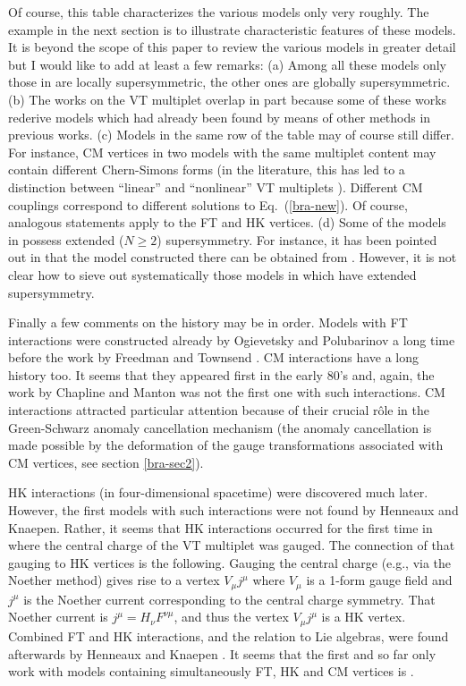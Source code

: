 \documentclass[a4paper,12pt]{article}
\begin{document}
Of course, this table characterizes the various models
only very roughly. 
The example in the next section is to illustrate characteristic
features of these models. It is beyond the scope of this
paper to review the various models in 
greater detail but I would like to add
at least a few remarks: (a) Among all these models
only those in \cite{bra-7} are locally supersymmetric, the
other ones are globally supersymmetric.
(b) The works on the VT multiplet
overlap in part because some of these
works rederive models which had already been found
by means of other methods in previous works.
(c) Models in the same row of the table may of course still differ. 
For instance,
CM vertices in two models with the same multiplet content 
may contain different Chern-Simons forms
(in the literature,
this has led to a distinction between
``linear'' and ``nonlinear'' VT multiplets \cite{bra-2}).
Different CM couplings
correspond to different solutions
to Eq.\ (\ref{bra-new}). Of course, analogous statements apply to the
FT and HK vertices.
(d) Some of the models
in \cite{bra-11} possess extended ($N\geq 2$)
supersymmetry. For instance, 
it has been pointed out in \cite{bra-12} that the model constructed
there can be obtained from \cite{bra-11}. 
However, it is not clear how to sieve out systematically
those models in \cite{bra-11} which have extended supersymmetry.

Finally a few comments on the history may be in order.
Models with FT interactions were constructed already
by Ogievetsky and Polubarinov \cite{bra-OP} a long time
before the work by Freedman and Townsend \cite{bra-FT}.
CM interactions have a long history too. It seems that
they appeared first
in the early 80's \cite{bra-NT,bra-Bergshoeff,bra-CM} and, again,
the work by Chapline and Manton was not the first 
one with such interactions.
CM interactions attracted particular attention because of their
crucial r\^ole in the Green-Schwarz anomaly cancellation
mechanism \cite{bra-GS} (the anomaly cancellation
is made possible by the deformation
of the gauge transformations
associated with CM vertices, see section \ref{bra-sec2}).

HK interactions (in four-dimensional spacetime)
were discovered much later. However, the first models 
with such interactions were
not found by Henneaux and Knaepen. Rather,
it seems that HK interactions occurred for the first time in
\cite{bra-1} where the central charge of the VT multiplet
was gauged. The connection of that gauging to HK vertices 
is the following.
Gauging the central charge (e.g., via the Noether method) 
gives rise to
a vertex $V_\mu j^\mu$ where $V_\mu$ is
a 1-form gauge field and $j^\mu$ is the Noether current
corresponding to the central charge symmetry. 
That Noether current is $j^\mu=H_\nu F^{\nu\mu}$,
and thus the vertex $V_\mu j^\mu$ is a HK vertex.
Combined FT and HK interactions, and
the relation to Lie algebras, were found afterwards
by Henneaux and Knaepen \cite{bra-HK1}.
It seems that the first and so far only work with models
containing simultaneously FT, HK and CM vertices
is \cite{bra-11}.
\end{document}
